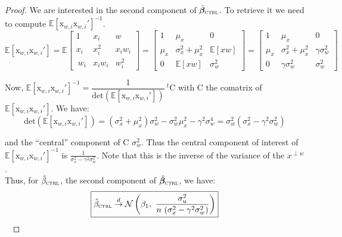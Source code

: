 \documentclass[a4paper, 11pt]{report}
\begin{document}
\begin{proof}
			We are interested in the second component of $\hat{\bm{\beta}}_{\textsc{ctrl}}$. To retrieve it we need to compute $\mathbb{E}[\text{x}_{w, i}\text{x}_{w, i}']^{-1}$. 
			~
			\[ 
				\mathbb{E}[\text{x}_{w, i}\text{x}_{w, i}'] 
				= \mathbb{E} \begin{bmatrix}
					1 & x_{i} & w\\ 
					x_{i} & x_{i}^{2} & x_{i}w_{i}\\\
					w_{i} & x_{i}w_{i} & w_{i}^{2}
				\end{bmatrix} 
				=
				\begin{bmatrix}
					1 & \mu_{x} & 0\\ 
					\mu_{x} & \sigma_{x}^{2} + \mu_{x}^{2} & \mathbb{E}[xw]\\
					0 & \mathbb{E}[xw] & \sigma_{w}^{2}
				\end{bmatrix} 
				=
				\begin{bmatrix}
					1 & \mu_{x} & 0\\ 
					\mu_{x} & \sigma_{x}^{2} + \mu_{x}^{2} & \gamma\sigma_{w}^{2}\\
					0 & \gamma\sigma_{w}^{2} & \sigma_{w}^{2}
				\end{bmatrix} 
				\]
				
				Now, $\mathbb{E}[\text{x}_{w, i}\text{x}_{w, i}']^{-1} = \dfrac{1}{\text{det}(\mathbb{E}[\text{x}_{w, i}\text{x}_{w, i}'])}~^{t}\text{C}$ with C the comatrix of $\mathbb{E}[\text{x}_{w, i}\text{x}_{w, i}']$. We have:
				~
				\[
					\text{det}(\mathbb{E}[\text{x}_{w, i}\text{x}_{w, i}']) = (\sigma_{x}^{2} + \mu_{x}^{2})\sigma_{w}^{2} -\sigma_{w}^{2}\mu_{x}^{2} - \gamma^{2}\sigma_{w}^{4} = \sigma_{w}^{2}(\sigma_{x}^{2} - \gamma^{2}\sigma_{w}^{2})
				\]
				
				and the ``central'' component of C $\sigma_{w}^{2}$. Thus the central component of interest of $\mathbb{E}[\text{x}_{w, i}\text{x}_{w, i}']^{-1}$ is $\frac{1}{\sigma_{x}^{2} - \gamma^{2}\sigma_{w}^{2}}$. Note that this is the inverse of the variance of the $x^{\perp w}$.\\
				
			Thus, for $\hat{\beta}_{\textsc{ctrl}}$, the second component of $\hat{\bm{\beta}}_{\textsc{ctrl}}$, we have:
				\begin{equation}
					\boxed{
						\hat{\beta}_{\textsc{ctrl}} \overset{d}{\to}
							 \mathcal{N}\left( \beta_1 , \ \dfrac{\sigma_{u}^{2}}{n \ (\sigma_{x}^{2} - \gamma^{2}\sigma_{w}^{2})} \right) 
					}
				\end{equation}
				~
				\end{proof}
				
\end{document}
